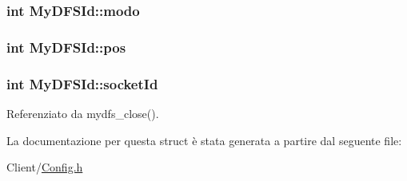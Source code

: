 \subsubsection[{modo}]{\setlength{\rightskip}{0pt plus 5cm}int My\+D\+F\+S\+Id\+::modo}\label{structMyDFSId_a98bc5ce1a7734459d8b81c997da4e9f0}
\hypertarget{structMyDFSId_aaeac229fb85c313f91a76f00be916832}{}
\subsubsection[{pos}]{\setlength{\rightskip}{0pt plus 5cm}int My\+D\+F\+S\+Id\+::pos}\label{structMyDFSId_aaeac229fb85c313f91a76f00be916832}
\hypertarget{structMyDFSId_a382a74f109962751085cea7aac2892cc}{}
\subsubsection[{socket\+Id}]{\setlength{\rightskip}{0pt plus 5cm}int My\+D\+F\+S\+Id\+::socket\+Id}\label{structMyDFSId_a382a74f109962751085cea7aac2892cc}


Referenziato da mydfs\+\_\+close().



La documentazione per questa struct è stata generata a partire dal seguente file\+:\begin{DoxyCompactItemize}
\item 
Client/\hyperlink{Client_2Config_8h}{Config.\+h}\end{DoxyCompactItemize}
